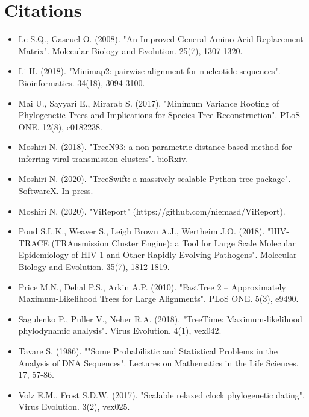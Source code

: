 \documentclass{article}
\begin{document}
\section{Citations}
\begin{itemize}
\item Le S.Q., Gascuel O. (2008). "An Improved General Amino Acid Replacement Matrix". Molecular Biology and Evolution. 25(7), 1307-1320.\item Li H. (2018). "Minimap2: pairwise alignment for nucleotide sequences". Bioinformatics. 34(18), 3094-3100.\item Mai U., Sayyari E., Mirarab S. (2017). "Minimum Variance Rooting of Phylogenetic Trees and Implications for Species Tree Reconstruction". PLoS ONE. 12(8), e0182238.\item Moshiri N. (2018). "TreeN93: a non-parametric distance-based method for inferring viral transmission clusters". bioRxiv.\item Moshiri N. (2020). "TreeSwift: a massively scalable Python tree package". SoftwareX. In press.\item Moshiri N. (2020). "ViReport" (https://github.com/niemasd/ViReport).\item Pond S.L.K., Weaver S., Leigh Brown A.J., Wertheim J.O. (2018). "HIV-TRACE (TRAnsmission Cluster Engine): a Tool for Large Scale Molecular Epidemiology of HIV-1 and Other Rapidly Evolving Pathogens". Molecular Biology and Evolution. 35(7), 1812-1819.\item Price M.N., Dehal P.S., Arkin A.P. (2010). "FastTree 2 -- Approximately Maximum-Likelihood Trees for Large Alignments". PLoS ONE. 5(3), e9490.\item Sagulenko P., Puller V., Neher R.A. (2018). "TreeTime: Maximum-likelihood phylodynamic analysis". Virus Evolution. 4(1), vex042.\item Tavare S. (1986). ""Some Probabilistic and Statistical Problems in the Analysis of DNA Sequences". Lectures on Mathematics in the Life Sciences. 17, 57-86.\item Volz E.M., Frost S.D.W. (2017). "Scalable relaxed clock phylogenetic dating". Virus Evolution. 3(2), vex025.\end{itemize}
\end{document}
